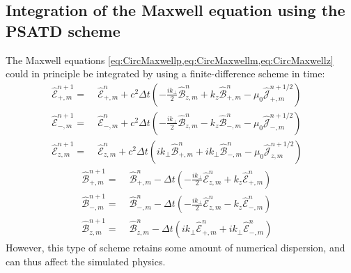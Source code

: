 \documentclass[1p,times]{elsarticle}
\newcommand{\tB}[2]{\spectral{B}_{#1,m}^{#2}}
\newcommand{\tE}[2]{\spectral{E}_{#1,m}^{#2}}
\newcommand{\tj}[2]{\spectral{J}_{#1,m}^{#2}}
\newcommand{\spectral}[1]{\hat{\mathcal{#1}}}
\begin{document}
\subsection{Integration of the Maxwell equation using the PSATD scheme}
\label{sec:FieldIntegration}

The Maxwell equations
\cref{eq:CircMaxwellp,eq:CircMaxwellm,eq:CircMaxwellz} could in
principle be integrated by using a finite-difference scheme in time:
\begin{subequations}
\begin{align}
\tE{+}{n+1} = \; & \tE{+}{n} + 
c^2\Delta t\left(-\frac{ik_\perp }{2} \tB{z}{n} + k_z\tB{+}{n}
- \mu_0 \tj{+}{n+1/2} \right) & \\
\tE{-}{n+1} =\; & \tE{-}{n} +
c^2\Delta t\left(- \frac{ik_\perp }{2} \tB{z}{n} - k_z\tB{-}{n}
- \mu_0 \tj{-}{n+1/2} \right) &\\
\tE{z}{n+1} =\; & \tE{z}{n} + 
c^2\Delta t\left(ik_\perp \tB{+}{n} + ik_\perp \tB{-}{n}
- \mu_0 \tj{z}{n+1/2} \right)  &
\end{align}
\end{subequations}
\begin{subequations}
\begin{align}
\tB{+}{n+1} = \; & \tB{+}{n} - 
\Delta t\left(-\frac{ik_\perp }{2} \tE{z}{n} + k_z\tE{+}{n}
\right) & \\
\tB{-}{n+1} =\; & \tB{-}{n} - 
\Delta t\left(- \frac{ik_\perp }{2} \tE{z}{n} - k_z\tE{-}{n}
\right) &\\
\tB{z}{n+1} =\; & \tB{z}{n} - 
\Delta t\left(ik_\perp \tE{+}{n} + ik_\perp \tE{-}{n}
\right) &
\end{align}
\end{subequations}
However, this type of scheme retains some amount of numerical dispersion, and can
thus affect the simulated physics.
\end{document}
